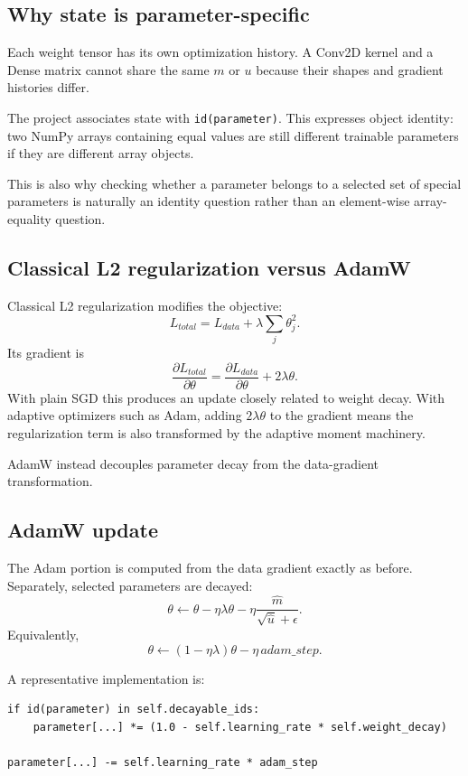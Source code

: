\documentclass[11pt,a4paper]{article}
\newcommand{\pd}[2]{\frac{\partial #1}{\partial #2}}
\newcommand{\code}[1]{\texttt{#1}}
\begin{document}
\subsection{Why state is parameter-specific}

Each weight tensor has its own optimization history. A Conv2D kernel and a Dense matrix cannot share the same $m$ or $u$ because their shapes and gradient histories differ.

The project associates state with \code{id(parameter)}. This expresses object identity: two NumPy arrays containing equal values are still different trainable parameters if they are different array objects.

This is also why checking whether a parameter belongs to a selected set of special parameters is naturally an identity question rather than an element-wise array-equality question.

\subsection{Classical L2 regularization versus AdamW}

Classical L2 regularization modifies the objective:
\[
L_{total}=L_{data}+\lambda\sum_j\theta_j^2.
\]
Its gradient is
\[
\pd{L_{total}}{\theta}
=
\pd{L_{data}}{\theta}+2\lambda\theta.
\]
With plain SGD this produces an update closely related to weight decay. With adaptive optimizers such as Adam, adding $2\lambda\theta$ to the gradient means the regularization term is also transformed by the adaptive moment machinery.

AdamW instead decouples parameter decay from the data-gradient transformation.

\subsection{AdamW update}

The Adam portion is computed from the data gradient exactly as before. Separately, selected parameters are decayed:
\[
\theta
\leftarrow
\theta-\eta\lambda\theta
-
\eta\frac{\hat m}{\sqrt{\hat u}+\epsilon}.
\]
Equivalently,
\[
\boxed{
\theta
\leftarrow
(1-\eta\lambda)\theta
-
\eta\,adam\_step
}.
\]

A representative implementation is:
\begin{lstlisting}
if id(parameter) in self.decayable_ids:
    parameter[...] *= (1.0 - self.learning_rate * self.weight_decay)

parameter[...] -= self.learning_rate * adam_step
\end{lstlisting}
\end{document}
